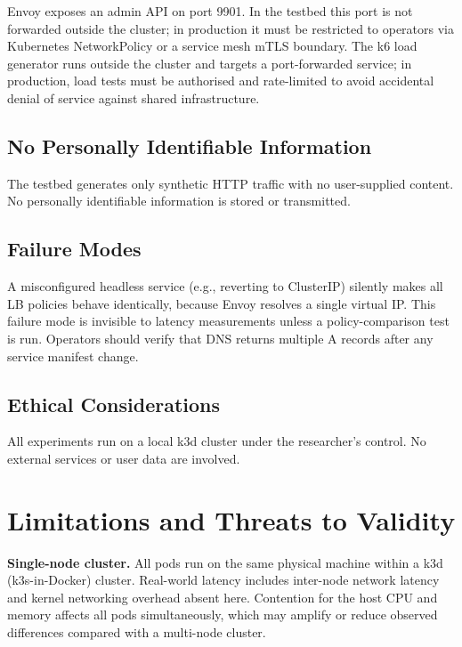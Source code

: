 \documentclass[conference]{IEEEtran}
\begin{document}
Envoy exposes an admin API on port 9901.
In the testbed this port is not forwarded outside the cluster; in production
it must be restricted to operators via Kubernetes NetworkPolicy or a service
mesh mTLS boundary.
The k6 load generator runs outside the cluster and targets a port-forwarded
service; in production, load tests must be authorised and rate-limited to
avoid accidental denial of service against shared infrastructure.

\subsection{No Personally Identifiable Information}

The testbed generates only synthetic HTTP traffic with no user-supplied
content.
No personally identifiable information is stored or transmitted.

\subsection{Failure Modes}

A misconfigured headless service (e.g., reverting to ClusterIP) silently
makes all LB policies behave identically, because Envoy resolves a single
virtual IP.
This failure mode is invisible to latency measurements unless a policy-comparison
test is run.
Operators should verify that DNS returns multiple A records after any service
manifest change.

\subsection{Ethical Considerations}

All experiments run on a local k3d cluster under the researcher's control.
No external services or user data are involved.

\section{Limitations and Threats to Validity}
\label{sec:limitations}

\textbf{Single-node cluster.}
All pods run on the same physical machine within a k3d (k3s-in-Docker)
cluster.
Real-world latency includes inter-node network latency and kernel networking
overhead absent here.
Contention for the host CPU and memory affects all pods simultaneously, which
may amplify or reduce observed differences compared with a multi-node cluster.
\end{document}

